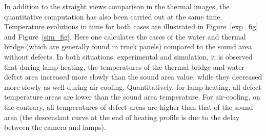 \documentclass{tQRT2e}
\begin{document}
In addition to the straight views comparison in the thermal images, the quantitative computation has also been carried out at the same time. Temperature evolutions in time for both cases are illustrated in Figure~\ref{exp_fig} and Figure~\ref{sim_fig}. Here one calculates the cases of the water and thermal bridge (which are generally found in truck panels) compared to the sound area without defects. In both situations, experimental and simulation, it is observed that during lamp-heating, the temperatures of the thermal bridge and water defect area increased more slowly than the sound area value, while they decreased more slowly as well during air cooling. Quantitatively, for lamp heating, all defect temperature areas are lower than the sound area temperature. For air-cooling, on the contrary, all temperatures of defect areas are higher than that of the sound area (the descendant curve at the end of heating profile is due to the delay between the camera and lamps).  
\end{document}
